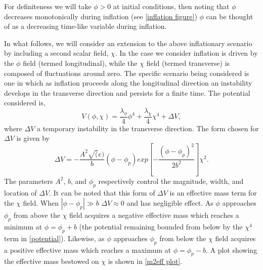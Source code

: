\documentclass[letterpaper,11pt]{article}
\begin{document}
For definiteness we will take $\phi>0$ at initial conditions, then noting that $\phi$ decreases monotonically during inflation (see \ref{inflation figure}) $\phi$ can be thought of as a decreasing time-like variable during inflation.

In what follows, we will consider an extension to the above inflationary scenario by including a second scalar field, $\chi$. In the case we consider inflation is driven by the $\phi$ field (termed longitudinal), while the  $\chi$ field (termed transverse) is composed of fluctuations around zero. The specific scenario being considered is one in which as inflation proceeds along the longitudinal direction an instability develops in the transverse direction and persists for a finite time. The potential considered is,
\begin{equation}
V(\phi, \chi) = \frac{\lambda_{\phi}}{4}\phi^4 + \frac{\lambda_{\chi}}{4}\chi^4 + \Delta V, \label{potential}
\end{equation}
where $\Delta V$ a temporary instability in the transverse direction. The form chosen for $\Delta V$ is given by
\begin{equation}
\Delta V = -\frac{A^2\sqrt(e)}{b}(\phi - \phi_p)exp[-\frac{(\phi-\phi_p)^2}{2b^2}]\chi^2.
\end{equation}
The parameters $A^2$, $b$, and $\phi_p$ respectively control the magnitude, width, and location of $\Delta V$. It can be noted that this form of $\Delta V$ is an effective mass term for the $\chi$ field. When $|\phi-\phi_p| \gg b$ $\Delta V \approx 0$ and has negligible effect. As $\phi$ approaches $\phi_p$ from above the $\chi$ field acquires a negative effective mass which reaches a minimum at $\phi = \phi_p + b$ (the potential remaining bounded from below by the $\chi^4$ term in \ref{potential}). Likewise, as $\phi$ approaches $\phi_p$ from below the $\chi$ field acquires a positive effective mass which reaches a maximum at $\phi = \phi_p - b$. A plot showing the effective mass bestowed on $\chi$ is shown in \ref{m2eff plot}.
\end{document}
